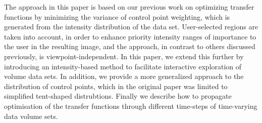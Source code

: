 The approach in this paper is based on our previous work%
\cite{luo_information-guided_2014} on optimizing transfer functions by minimizing the variance of control point weighting, which is generated from the intensity distribution of the data set. User-selected regions are taken into account, in order to enhance priority intensity ranges of importance to the user in the resulting image, and the approach,  in contrast to others discussed previously, is viewpoint-independent.
In this paper, we extend this further by introducing
an intensity-based method to facilitate interactive exploration of volume data sets. In addition, we provide a more generalized approach to the distribution of control points, which in the original paper was limited to simplified tent-shaped distrubtions. Finally we describe how to propagate optimisation of the transfer functions through different time-steps of time-varying data volume sets.


